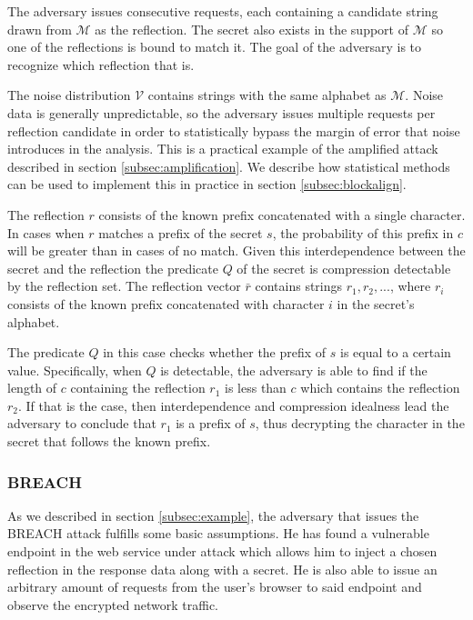 \documentclass[conference, letterpaper, 10pt]{IEEEtran}
\begin{document}
The adversary issues consecutive requests, each containing a candidate string
drawn from $\mathcal{M}$ as the reflection. The secret also exists in the
support of $\mathcal{M}$ so one of the reflections is bound to match it. The
goal of the adversary is to recognize which reflection that is.

The noise distribution $\mathcal{V}$ contains strings with the same alphabet as
$\mathcal{M}$. Noise data is generally unpredictable, so the adversary issues
multiple requests per reflection candidate in order to statistically bypass the
margin of error that noise introduces in the analysis. This is a practical
example of the amplified attack described in section \ref{subsec:amplification}.
We describe how statistical methods can be used to implement this in practice in
section \ref{subsec:blockalign}.

The reflection $r$ consists of the known prefix concatenated with a single
character. In cases when $r$ matches a prefix of the secret $s$, the probability
of this prefix in $c$ will be greater than in cases of no match.
Given this interdependence between the secret and the reflection the predicate
$Q$ of the secret is compression detectable by the reflection set. The
reflection vector $\bar{r}$ contains strings $r_1, r_2, ...$, where $r_i$
consists of the known prefix concatenated with character $i$ in the secret's
alphabet.

The predicate $Q$ in this case checks whether the prefix of $s$ is equal to a
certain value. Specifically, when $Q$ is detectable, the adversary is able to
find if the length of $c$ containing the reflection $r_1$ is less than
$c$ which contains the reflection $r_2$. If that is the case, then
interdependence and compression idealness lead the adversary to conclude that
$r_1$ is a prefix of $s$, thus decrypting the character in the secret that
follows the known prefix.

\subsubsection{BREACH}
As we described in section \ref{subsec:example}, the adversary that issues the
BREACH attack fulfills some basic assumptions. He has found a vulnerable
endpoint in the web service under attack which allows him to inject a chosen
reflection in the response data along with a secret. He is also able to issue an
arbitrary amount of requests from the user's browser to said endpoint and
observe the encrypted network traffic.
\end{document}
